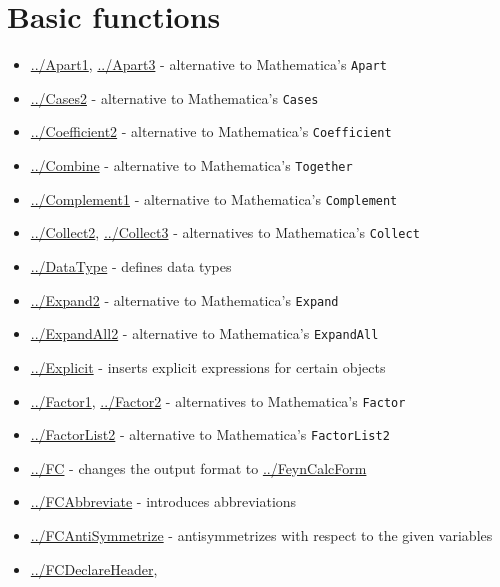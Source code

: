 \documentclass[../FeynCalcManual.tex]{subfiles}
\begin{document}
\hypertarget{basic functions}{
\section{Basic functions}\label{basic functions}}

\begin{itemize}
\tightlist
\item
  \hyperlink{../apart1}{../Apart1}, \hyperlink{../apart3}{../Apart3} -
  alternative to Mathematica's \texttt{Apart}
\item
  \hyperlink{../cases2}{../Cases2} - alternative to Mathematica's
  \texttt{Cases}
\item
  \hyperlink{../coefficient2}{../Coefficient2} - alternative to
  Mathematica's \texttt{Coefficient}
\item
  \hyperlink{../combine}{../Combine} - alternative to Mathematica's
  \texttt{Together}
\item
  \hyperlink{../complement1}{../Complement1} - alternative to
  Mathematica's \texttt{Complement}
\item
  \hyperlink{../collect2}{../Collect2},
  \hyperlink{../collect3}{../Collect3} - alternatives to Mathematica's
  \texttt{Collect}
\item
  \hyperlink{../datatype}{../DataType} - defines data types
\item
  \hyperlink{../expand2}{../Expand2} - alternative to Mathematica's
  \texttt{Expand}
\item
  \hyperlink{../expandall2}{../ExpandAll2} - alternative to
  Mathematica's \texttt{ExpandAll}
\item
  \hyperlink{../explicit}{../Explicit} - inserts explicit expressions
  for certain objects
\item
  \hyperlink{../factor1}{../Factor1}, \hyperlink{../factor2}{../Factor2}
  - alternatives to Mathematica's \texttt{Factor}
\item
  \hyperlink{../factorlist2}{../FactorList2} - alternative to
  Mathematica's \texttt{FactorList2}
\item
  \hyperlink{../fc}{../FC} - changes the output format to
  \hyperlink{../feyncalcform}{../FeynCalcForm}
\item
  \hyperlink{../fcabbreviate}{../FCAbbreviate} - introduces
  abbreviations
\item
  \hyperlink{../fcantisymmetrize}{../FCAntiSymmetrize} - antisymmetrizes
  with respect to the given variables
\item
  \hyperlink{../fcdeclareheader}{../FCDeclareHeader},

\end{itemize}
\end{document}
